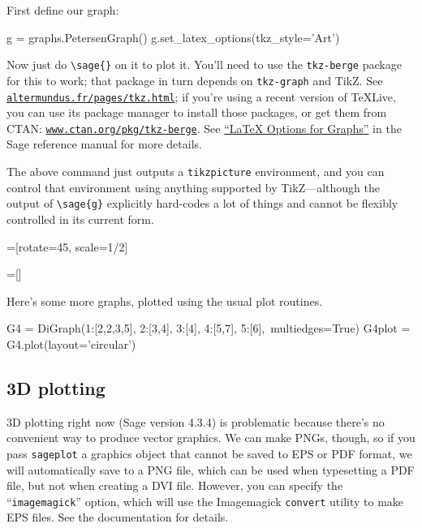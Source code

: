 \documentclass{article}
\begin{document}
First define our graph:

\begin{sageblock}
  g = graphs.PetersenGraph()
  g.set_latex_options(tkz_style='Art')
\end{sageblock}

Now just do \verb|\sage{}| on it to plot it. You'll need to use the
\texttt{tkz-berge} package for this to work; that package in turn
depends on \texttt{tkz-graph} and TikZ. See
\href{http://altermundus.fr/pages/tkz.html}{\texttt{altermundus.fr/pages/tkz.html}};
if you're using a recent version of \TeX Live, you can use its package
manager to install those packages, or get them from CTAN:
\href{http://www.ctan.org/pkg/tkz-berge}{\texttt{www.ctan.org/pkg/tkz-berge}}.
See
\href{http://doc.sagemath.org/html/en/reference/sage/graphs/graph_latex.html}{``\LaTeX{}
  Options for Graphs''} in the Sage reference manual for more details.

\begin{center}
\end{center}

The above command just outputs a \texttt{tikzpicture} environment, and
you can control that environment using anything supported by
TikZ---although the output of \verb|\sage{g}| explicitly hard-codes a
lot of things and cannot be flexibly controlled in its current form.

=[rotate=45, scale=1/2]

\begin{center}
\end{center}

=[]

Here's some more graphs, plotted using the usual plot routines.


\begin{sageblock}
G4 = DiGraph({1:[2,2,3,5], 2:[3,4], 3:[4], 4:[5,7], 5:[6]},\
             multiedges=True)
G4plot = G4.plot(layout='circular')
\end{sageblock}




\subsection{3D plotting}

3D plotting right now (Sage version 4.3.4) is problematic because
there's no convenient way to produce vector graphics. We can make PNGs,
though, so if you pass \verb|sageplot| a graphics object that cannot be
saved to EPS or PDF format, we will automatically save to a PNG file,
which can be used when typesetting a PDF file, but not when creating a
DVI file. However, you can specify the ``\texttt{imagemagick}'' option,
which will use the Imagemagick \texttt{convert} utility to make EPS
files. See the documentation for details.
\end{document}
